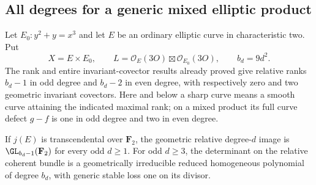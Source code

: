 \subsection{All degrees for a generic mixed elliptic product}
\label{subsec:generic-mixed-product-groups-candidate}

Let $E_0:y^2+y=x^3$ and let $E$ be an ordinary elliptic curve
in characteristic two. Put
\[
 X=E\times E_0,\qquad
 L=\mathcal O_E(3O)\boxtimes\mathcal O_{E_0}(3O),\qquad
 b_d=9d^2.
\]
The rank and entire invariant-covector results already proved give
relative ranks $b_d-1$ in odd degree and $b_d-2$ in even degree,
with respectively zero and two geometric invariant covectors.
Here and below a sharp curve means a smooth curve attaining the
indicated maximal rank; on a mixed product its full curve defect
$g-f$ is one in odd degree and two in even degree.

\begin{lemma}
\label{lem:generic-mixed-odd-groups-candidate}
If $j(E)$ is transcendental over $\mathbf F_2$, the geometric
relative degree-$d$ image is $\GL_{b_d-1}(\mathbf F_2)$ for every
odd $d\ge1$. For odd $d\ge3$, the determinant on the relative
coherent bundle is a geometrically irreducible reduced homogeneous
polynomial of degree $b_d$, with generic stable loss one on its
divisor.
\end{lemma}

